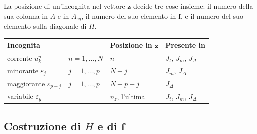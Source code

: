 \documentclass[11pt,a4paper]{article}
\newcommand{\vett}[1]{\boldsymbol{#1}}      %
\begin{document}
La posizione di un'incognita nel vettore $\vett{z}$ decide tre cose insieme: il
numero della sua colonna in $A$ e in $A_{eq}$, il numero del suo elemento in
$\vett{f}$, e il numero del suo elemento sulla diagonale di $H$.

\begin{center}
\begin{tabular}{llll}
\toprule
Incognita & & Posizione in $\vett{z}$ & Presente in \\
\midrule
corrente $u^n_k$ & $n = 1,\dots,N$ & $n$ & $J_t$, $J_m$, $J_\Delta$ \\
minorante $\varepsilon_j$ & $j = 1,\dots,p$ & $N + j$ & $J_m$, $J_\Delta$ \\
maggiorante $\varepsilon_{p+j}$ & $j = 1,\dots,p$ & $N + p + j$ & $J_\Delta$ \\
variabile $\varepsilon_y$ & & $n_z$, l'ultima & $J_t$, $J_m$, $J_\Delta$ \\
\bottomrule
\end{tabular}
\end{center}

\subsection{Costruzione di $H$ e di $\vett{f}$}\label{sec:passi-costo}
\end{document}
